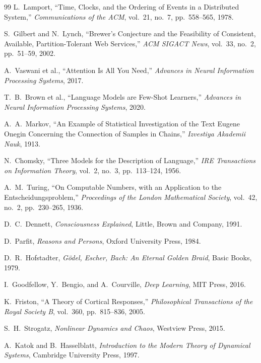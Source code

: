 \documentclass[12pt, a4paper]{article}
\theoremstyle{plain}
\theoremstyle{definition}
\theoremstyle{remark}
\begin{document}
\begin{thebibliography}{99}
L.~Lamport,
``Time, Clocks, and the Ordering of Events in a Distributed System,''
\emph{Communications of the ACM}, vol.~21, no.~7, pp.~558--565, 1978.

S.~Gilbert and N.~Lynch,
``Brewer's Conjecture and the Feasibility of Consistent, Available, Partition-Tolerant Web Services,''
\emph{ACM SIGACT News}, vol.~33, no.~2, pp.~51--59, 2002.

A.~Vaswani et al.,
``Attention Is All You Need,''
\emph{Advances in Neural Information Processing Systems}, 2017.

T.~B.~Brown et al.,
``Language Models are Few-Shot Learners,''
\emph{Advances in Neural Information Processing Systems}, 2020.

A.~A.~Markov,
``An Example of Statistical Investigation of the Text Eugene Onegin Concerning the Connection of Samples in Chains,''
\emph{Izvestiya Akademii Nauk}, 1913.

N.~Chomsky,
``Three Models for the Description of Language,''
\emph{IRE Transactions on Information Theory}, vol.~2, no.~3, pp.~113--124, 1956.

A.~M.~Turing,
``On Computable Numbers, with an Application to the Entscheidungsproblem,''
\emph{Proceedings of the London Mathematical Society}, vol.~42, no.~2, pp.~230--265, 1936.

D.~C.~Dennett,
\emph{Consciousness Explained},
Little, Brown and Company, 1991.

D.~Parfit,
\emph{Reasons and Persons},
Oxford University Press, 1984.

D.~R.~Hofstadter,
\emph{G\"{o}del, Escher, Bach: An Eternal Golden Braid},
Basic Books, 1979.

I.~Goodfellow, Y.~Bengio, and A.~Courville,
\emph{Deep Learning},
MIT Press, 2016.

K.~Friston,
``A Theory of Cortical Responses,''
\emph{Philosophical Transactions of the Royal Society B}, vol.~360, pp.~815--836, 2005.

S.~H.~Strogatz,
\emph{Nonlinear Dynamics and Chaos},
Westview Press, 2015.

A.~Katok and B.~Hasselblatt,
\emph{Introduction to the Modern Theory of Dynamical Systems},
Cambridge University Press, 1997.

\end{thebibliography}
\end{document}
